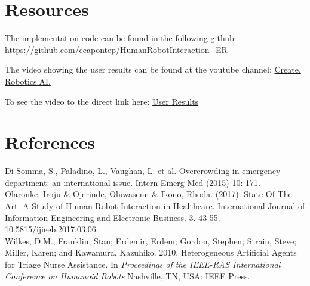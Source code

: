 \documentclass[letterpaper]{article}
\begin{document}
\section{Resources}
The implementation code can be found in the following github: \\ \url{https://github.com/ccapontep/HumanRobotInteraction_ER} \bigskip

\noindent
The video showing the user results can be found at the youtube channel: \href{https://www.youtube.com/channel/UCgLahJX6Fz3qhQzgIl7dD8w?disable_polymer=true}{Create. Robotics.AI.} \bigskip

\noindent
To see the video to the direct link here: \href{https://www.youtube.com/watch?v=B4sg4iSE8-Q}{User Results}

\section{References} 

Di Somma, S., Paladino, L., Vaughan, L. et al. Overcrowding in emergency department: an international issue. Intern Emerg Med (2015) 10: 171.
\\

\noindent Olaronke, Iroju & Ojerinde, Oluwaseun & Ikono, Rhoda. (2017). State Of The Art: A Study of Human-Robot Interaction in Healthcare. International Journal of Information Engineering and Electronic Business. 3. 43-55. 10.5815/ijieeb.2017.03.06. 
\\

\noindent Wilkes, D.M.; Franklin, Stan; Erdemir, Erdem; Gordon, Stephen; Strain, Steve; Miller, Karen; and Kawamura, Kazuhiko. 2010. Heterogeneous Artificial Agents for Triage Nurse Assistance. In \textit{Proceedings of the IEEE-RAS International Conference on Humanoid Robots} Nashville, TN, USA: IEEE Press.
\end{document}
